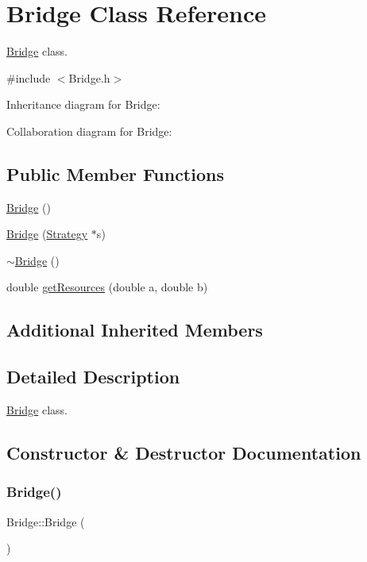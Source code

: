 \hypertarget{classBridge}{}\section{Bridge Class Reference}
\label{classBridge}


\hyperlink{classBridge}{Bridge} class.  




{\ttfamily \#include $<$Bridge.\+h$>$}



Inheritance diagram for Bridge\+:


Collaboration diagram for Bridge\+:
\subsection*{Public Member Functions}
\begin{DoxyCompactItemize}
\item 
\hyperlink{classBridge_a275f54dafc95c9b5bbaba5e904c4fa9a}{Bridge} ()
\item 
\hyperlink{classBridge_a31994152fc209370604140c3591339c9}{Bridge} (\hyperlink{classStrategy}{Strategy} $\ast$s)
\item 
\hyperlink{classBridge_a812b325fbb4f4b589e68f11f443a7ee4}{$\sim$\+Bridge} ()
\item 
double \hyperlink{classBridge_a1508c1c9cfb44850fea31afcb7f1e403}{get\+Resources} (double a, double b)
\end{DoxyCompactItemize}
\subsection*{Additional Inherited Members}


\subsection{Detailed Description}
\hyperlink{classBridge}{Bridge} class. 

\subsection{Constructor \& Destructor Documentation}
\mbox{\label{classBridge_a275f54dafc95c9b5bbaba5e904c4fa9a}} 
\subsubsection{\texorpdfstring{Bridge()}{Bridge()}\hspace{0.1cm}{\footnotesize\ttfamily [1/2]}}
{\footnotesize\ttfamily Bridge\+::\+Bridge (\begin{DoxyParamCaption}{ }\end{DoxyParamCaption})}

